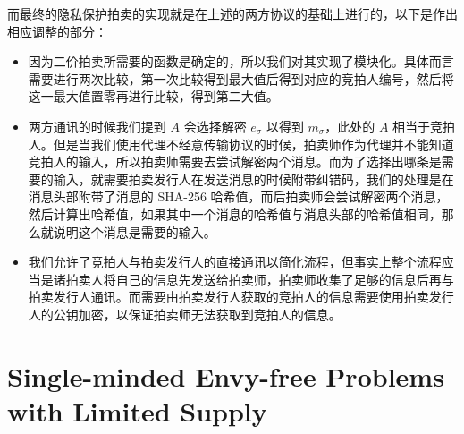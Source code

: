 而最终的隐私保护拍卖的实现就是在上述的两方协议的基础上进行的，以下是作出相应调整的部分：

\begin{itemize}
    \item 因为二价拍卖所需要的函数是确定的，所以我们对其实现了模块化。具体而言需要进行两次比较，第一次比较得到最大值后得到对应的竞拍人编号，然后将这一最大值置零再进行比较，得到第二大值。
    \item 两方通讯的时候我们提到 $A$ 会选择解密 $e_{\sigma}$ 以得到 $m_{\sigma}$，此处的 $A$ 相当于竞拍人。但是当我们使用代理不经意传输协议的时候，拍卖师作为代理并不能知道竞拍人的输入，所以拍卖师需要去尝试解密两个消息。而为了选择出哪条是需要的输入，就需要拍卖发行人在发送消息的时候附带纠错码，我们的处理是在消息头部附带了消息的 SHA-256 哈希值，而后拍卖师会尝试解密两个消息，然后计算出哈希值，如果其中一个消息的哈希值与消息头部的哈希值相同，那么就说明这个消息是需要的输入。
    \item 我们允许了竞拍人与拍卖发行人的直接通讯以简化流程，但事实上整个流程应当是诸拍卖人将自己的信息先发送给拍卖师，拍卖师收集了足够的信息后再与拍卖发行人通讯。而需要由拍卖发行人获取的竞拍人的信息需要使用拍卖发行人的公钥加密，以保证拍卖师无法获取到竞拍人的信息。
\end{itemize}
\section{Single-minded Envy-free Problems with Limited Supply}
